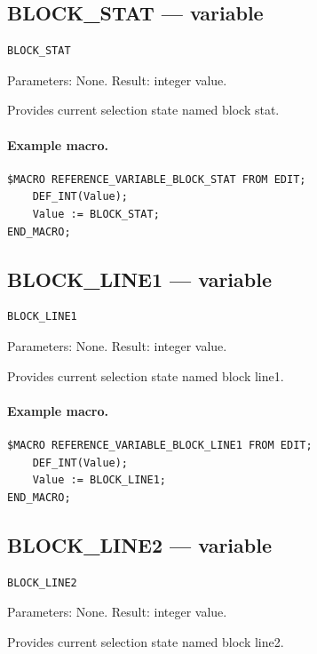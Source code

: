 \documentclass[a4paper,10pt,twoside,openany]{book}
\begin{document}
\subsection*{BLOCK\_STAT --- variable}
\begin{verbatim}
BLOCK_STAT
\end{verbatim}
Parameters: None. Result: integer value.

Provides current selection state named block stat.

\paragraph{Example macro.}
\begin{verbatim}
$MACRO REFERENCE_VARIABLE_BLOCK_STAT FROM EDIT;
    DEF_INT(Value);
    Value := BLOCK_STAT;
END_MACRO;
\end{verbatim}

\label{prim:variable-block-line1}
\subsection*{BLOCK\_LINE1 --- variable}
\begin{verbatim}
BLOCK_LINE1
\end{verbatim}
Parameters: None. Result: integer value.

Provides current selection state named block line1.

\paragraph{Example macro.}
\begin{verbatim}
$MACRO REFERENCE_VARIABLE_BLOCK_LINE1 FROM EDIT;
    DEF_INT(Value);
    Value := BLOCK_LINE1;
END_MACRO;
\end{verbatim}

\label{prim:variable-block-line2}
\subsection*{BLOCK\_LINE2 --- variable}
\begin{verbatim}
BLOCK_LINE2
\end{verbatim}
Parameters: None. Result: integer value.

Provides current selection state named block line2.
\end{document}
